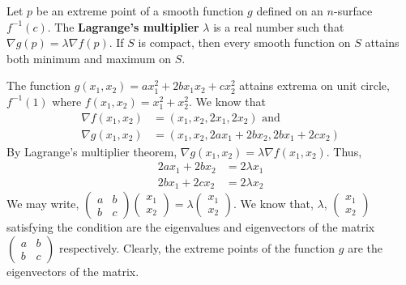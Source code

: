 \begin{remark}
	Let $p$ be an extreme point of a smooth function $g$ defined on an $n$-surface $f^{-1}(c)$.
	The \textbf{Lagrange's multiplier} $\lambda$ is a real number such that $\nabla g(p) = \lambda \nabla f(p)$.
	If $S$ is compact, then every smooth function on $S$ attains both minimum and maximum on $S$.
\end{remark}

\begin{important}
	The function $g(x_1,x_2) = ax_1^2 + 2bx_1x_2 + cx_2^2$ attains extrema on unit circle, $f^{-1}(1)$ where $f(x_1,x_2) = x_1^2 + x_2^2$. We know that 
	\begin{align*}
		\nabla f(x_1,x_2) & = (x_1,x_2,2x_1,2x_2) \text{ and } \\
		\nabla g(x_1,x_2) & = (x_1,x_2,2ax_1+2bx_2,2bx_1+2cx_2)
	\end{align*}
	By Lagrange's multiplier theorem, $\nabla g(x_1,x_2) = \lambda \nabla f(x_1,x_2)$. Thus,
	\begin{align*}
		2ax_1 +2bx_2 & = 2\lambda x_1 \\
		2bx_1 +2cx_2 & = 2\lambda x_2 
	\end{align*}
	We may write, $\begin{pmatrix}a & b \\ b & c \end{pmatrix} \begin{pmatrix} x_1 \\ x_2 \end{pmatrix} = \lambda \begin{pmatrix} x_1 \\ x_2 \end{pmatrix} $.
	We know that, $\lambda$, $\begin{pmatrix}x_1 \\ x_2 \end{pmatrix}$  satisfying the condition are the eigenvalues and eigenvectors of the matrix $\begin{pmatrix} a & b \\ b & c \end{pmatrix}$ respectively. Clearly, the extreme points of the function $g$ are the eigenvectors of the matrix.
\end{important}

